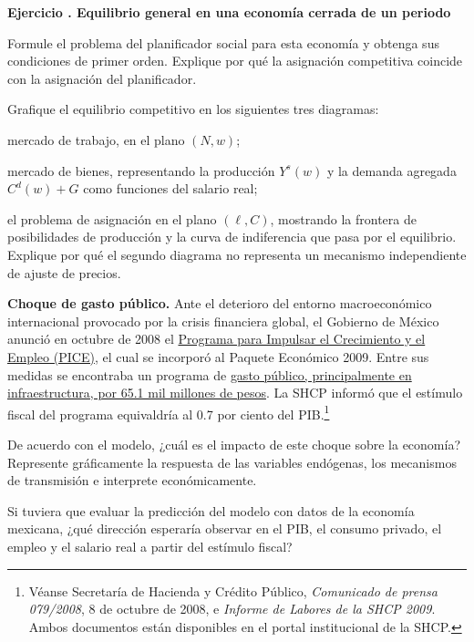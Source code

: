\documentclass[11pt]{article}
\let\enumerateoriginal\enumerate
\let\endenumerateoriginal\endenumerate
\renewenvironment{enumerate}{%
  \enumerateoriginal
  \setlength{\itemsep}{0.5em}%
  \setlength{\parsep}{0pt}%
  \setlength{\topsep}{0.4em}%
}{\endenumerateoriginal}
\newcounter{problema}
\newenvironment{problema}[1]{%
  \par
  \refstepcounter{problema}%
  \addvspace{0.9em}%
  \noindent\textbf{Ejercicio \theproblema. #1}
  \par\nobreak\smallskip
}{\par}
\begin{document}
\begin{problema}{Equilibrio general en una economía cerrada de un periodo}
\begin{enumerate}
  \item Formule el problema del planificador social para esta economía y obtenga sus condiciones de primer orden. Explique por qué la asignación competitiva coincide con la asignación del planificador.

  \item Grafique el equilibrio competitivo en los siguientes tres diagramas:
  \begin{enumerate}
    \renewcommand{\labelenumii}{\textnormal{(\roman{enumii})}}
    \item mercado de trabajo, en el plano $(N,w)$;
    \item mercado de bienes, representando la producción $Y^s(w)$ y la demanda agregada $C^d(w)+G$ como funciones del salario real;
    \item el problema de asignación en el plano $(\ell,C)$, mostrando la frontera de posibilidades
    de producción y la curva de indiferencia que pasa por el equilibrio.
  \end{enumerate}
  Explique por qué el segundo diagrama no representa un mecanismo independiente de ajuste de precios.

  \item \textbf{Choque de gasto público.}
 Ante el deterioro del entorno macroeconómico internacional provocado por la crisis financiera global, el Gobierno de México anunció en octubre de 2008 el \href{https://www.eleconomista.com.mx/el-empresario/Felipe-Calderon-lanza-plan-anticrisis-financiera-20081009-0003.html}{Programa para Impulsar el Crecimiento y el Empleo (PICE)}, el cual se incorporó al Paquete Económico 2009. Entre sus medidas se encontraba un programa de \href{https://expansion.mx/expansion/2008/12/02/cartera-abierta}{gasto público, principalmente en infraestructura, por 65.1 mil millones de pesos}. La SHCP informó que el estímulo fiscal del programa equivaldría al 0.7 por ciento del PIB.\footnote{Véanse Secretaría de Hacienda y Crédito Público, \emph{Comunicado de prensa 079/2008}, 8 de octubre de 2008, e \emph{Informe de Labores de la SHCP 2009}. Ambos documentos están disponibles en el portal institucional de la SHCP.}
  \begin{enumerate}
    \renewcommand{\labelenumii}{\textnormal{(\roman{enumii})}}
    \item De acuerdo con el modelo, ¿cuál es el impacto de este choque sobre la economía? Represente gráficamente la respuesta de las variables endógenas, los mecanismos de transmisión e interprete económicamente.
    \item Si tuviera que evaluar la predicción del modelo con datos de la economía mexicana, ¿qué dirección esperaría observar en el PIB, el consumo privado, el empleo y el salario real a partir del estímulo fiscal? 
  \end{enumerate}


\end{enumerate}
\end{problema}
\end{document}
